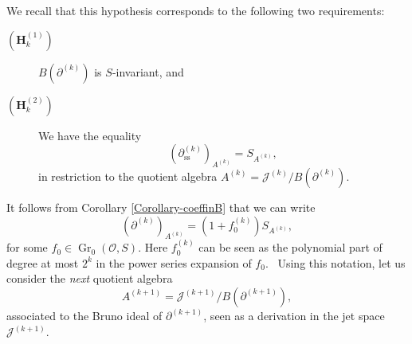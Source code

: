 \documentclass[10pt,twoside,reqno]{amsart}
\theoremstyle{remark}
\theoremstyle{remark}
\newcommand{\tmem}[1]{{\em #1\/}}
\newcommand{\tmmathbf}[1]{{\boldsymbol{#1}}}
\newcommand{\tmop}[1]{{\operatorname{#1}}}
\newcommand{\vO}{\mathcal{O}}
\begin{document}
\noindent We recall that this hypothesis corresponds to the following two requirements: \
\begin{description}
  \item[$(\tmmathbf{H}_k^{(1)})$] $B (\partial^{(k)})$ is $S$-invariant, and
  \item[$(\tmmathbf{H}_k^{(2)})$] We have the equality
  \[ (\partial^{(k)}_{\tmop{ss}})_{A^{(k)}} = S_{A^{(k)}}, \]
  in restriction to the quotient algebra $A^{(k)} = \mathcal{J}^{(k)} / B(\partial^{(k)}) .$
\end{description}
It follows from Corollary \ref{Corollary-coeffinB} that we can write
\begin{equation}
  (\partial^{(k)})_{A^{(k)}} = (1 + f_0^{(k)}) S_{A^{(k)}},
  \label{Aktruncation}
\end{equation}
for some $f_0  \in \tmop{Gr}_0 \left( \vO, S \right)$. Here $f_0^{(k)}
$ can be seen as the polynomial part of degree at most $2^k$ in the power series expansion of
$f_0$. \ Using this notation, let us consider the {\tmem{next}} quotient
algebra
\[ A^{(k + 1)} = \mathcal{J}^{(k + 1)} / B (\partial^{(k + 1)}), \]
associated to the Bruno ideal of $\partial^{(k + 1)}$, seen as a derivation in
the jet space $\mathcal{J}^{(k + 1)}$.  
\end{document}
